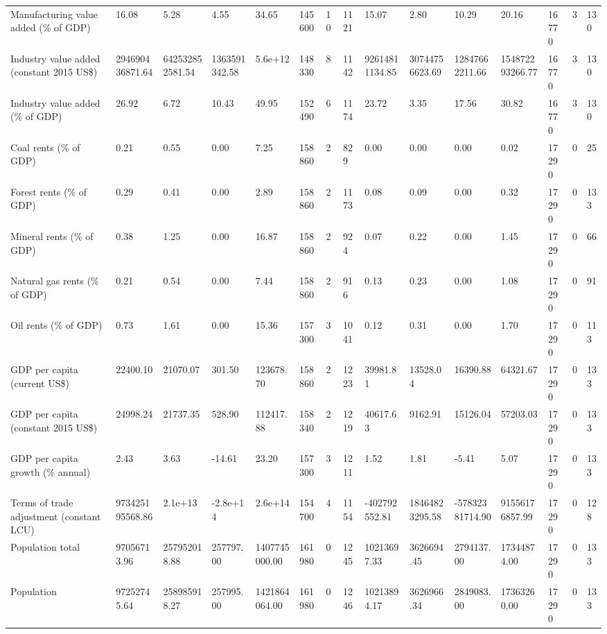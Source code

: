 \begin{longtable}{lllllllllllllll}
\addlinespace
Manufacturing value added (\% of GDP) & 16.08 & 5.28 & 4.55 & 34.65 & 145600 & 10 & 1121 & 15.07 & 2.80 & 10.29 & 20.16 & 16770 & 3 & 130\\
Industry value added (constant 2015 US\$) & 294690436871.64 & 642532852581.54 & 1363591342.58 & 5.6e+12 & 148330 & 8 & 1142 & 92614811134.85 & 30744756623.69 & 12847662211.66 & 154872293266.77 & 16770 & 3 & 130\\
Industry value added (\% of GDP) & 26.92 & 6.72 & 10.43 & 49.95 & 152490 & 6 & 1174 & 23.72 & 3.35 & 17.56 & 30.82 & 16770 & 3 & 130\\
Coal rents (\% of GDP) & 0.21 & 0.55 & 0.00 & 7.25 & 158860 & 2 & 829 & 0.00 & 0.00 & 0.00 & 0.02 & 17290 & 0 & 25\\
Forest rents (\% of GDP) & 0.29 & 0.41 & 0.00 & 2.89 & 158860 & 2 & 1173 & 0.08 & 0.09 & 0.00 & 0.32 & 17290 & 0 & 133\\
\addlinespace
Mineral rents (\% of GDP) & 0.38 & 1.25 & 0.00 & 16.87 & 158860 & 2 & 924 & 0.07 & 0.22 & 0.00 & 1.45 & 17290 & 0 & 66\\
Natural gas rents (\% of GDP) & 0.21 & 0.54 & 0.00 & 7.44 & 158860 & 2 & 916 & 0.13 & 0.23 & 0.00 & 1.08 & 17290 & 0 & 91\\
Oil rents (\% of GDP) & 0.73 & 1.61 & 0.00 & 15.36 & 157300 & 3 & 1041 & 0.12 & 0.31 & 0.00 & 1.70 & 17290 & 0 & 113\\
GDP per capita (current US\$) & 22400.10 & 21070.07 & 301.50 & 123678.70 & 158860 & 2 & 1223 & 39981.81 & 13528.04 & 16390.88 & 64321.67 & 17290 & 0 & 133\\
GDP per capita (constant 2015 US\$) & 24998.24 & 21737.35 & 528.90 & 112417.88 & 158340 & 2 & 1219 & 40617.63 & 9162.91 & 15126.04 & 57203.03 & 17290 & 0 & 133\\
\addlinespace
GDP per capita growth (\% annual) & 2.43 & 3.63 & -14.61 & 23.20 & 157300 & 3 & 1211 & 1.52 & 1.81 & -5.41 & 5.07 & 17290 & 0 & 133\\
Terms of trade adjustment (constant LCU) & 973425195568.86 & 2.1e+13 & -2.8e+14 & 2.6e+14 & 154700 & 4 & 1154 & -402792552.81 & 18464823295.58 & -57832381714.90 & 91556176857.99 & 17290 & 0 & 128\\
Population total & 97056713.96 & 257952018.88 & 257797.00 & 1407745000.00 & 161980 & 0 & 1245 & 10213697.33 & 3626694.45 & 2794137.00 & 17344874.00 & 17290 & 0 & 133\\
Population & 97252745.64 & 258985918.27 & 257995.00 & 1421864064.00 & 161980 & 0 & 1246 & 10213894.17 & 3626966.34 & 2849083.00 & 17363260.00 & 17290 & 0 & 133\\

\end{longtable}
